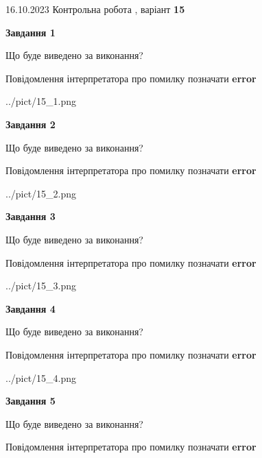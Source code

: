 \documentclass[12pt, ukrainian]{article}
\begin{document}
{\Large{16.10.2023 Контрольна робота , варіант  \No \textbf { 15 }\par}}
{
\begin {large}
{\begin {center}\textbf{Завдання 1}\end {center}}\par
Що буде виведено за виконання? \par
Повідомлення інтерпретатора про помилку позначати \textbf{error}

\begin{center}
	{../pict/15_1.png}
\end{center}
\newpage

{\begin {center}\textbf{Завдання 2}\end {center}}\par
Що буде виведено за виконання? \par
Повідомлення інтерпретатора про помилку позначати \textbf{error}

\begin{center}
	{../pict/15_2.png}
\end{center}
\newpage

{\begin {center}\textbf{Завдання 3}\end {center}}\par
Що буде виведено за виконання? \par
Повідомлення інтерпретатора про помилку позначати \textbf{error}

\begin{center}
	{../pict/15_3.png}
\end{center}
\newpage

{\begin {center}\textbf{Завдання 4}\end {center}}\par
Що буде виведено за виконання? \par
Повідомлення інтерпретатора про помилку позначати \textbf{error}

\begin{center}
	{../pict/15_4.png}
\end{center}
\newpage

{\begin {center}\textbf{Завдання 5}\end {center}}\par
Що буде виведено за виконання? \par
Повідомлення інтерпретатора про помилку позначати \textbf{error}


\end{large}}
\end{document}
